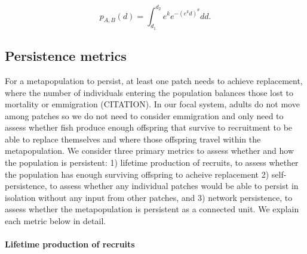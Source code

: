 \documentclass[12pt, oneside]{article}   	%
\begin{document}
\begin{equation} %
p_{A, B}(d) = \int_{d_1}^{d_2} e^k e^{-(e^k d)^\theta}  dd. \label{EQN_integratingDK}
\end{equation}

\subsection*{Persistence metrics}


For a metapopulation to persist, at least one patch needs to achieve replacement, where the number of individuals entering the population balances those lost to mortality or emmigration (CITATION). In our focal system, adults do not move among patches so we do not need to consider emmigration and only need to assess whether fish produce enough offspring that survive to recruitment to be able to replace themselves and where those offspring travel within the metapopulation. We consider three primary metrics to assess whether and how the population is persistent: 1) lifetime production of recruits, to assess whether the population has enough surviving offspring to acheive replacement 2) self-persistence, to assess whether any individual patches would be able to persist in isolation without any input from other patches, and 3) network persistence, to assess whether the metapopulation is persistent as a connected unit. We explain each metric below in detail. %

\paragraph*{Lifetime production of recruits}


\end{document}
